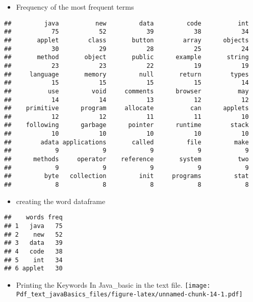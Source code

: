 \documentclass[]{article}
\providecommand{\tightlist}{%
  \setlength{\itemsep}{0pt}\setlength{\parskip}{0pt}}
\begin{document}
\begin{itemize}
\tightlist
\item
  Frequency of the most frequent terms
\end{itemize}

\begin{verbatim}
##         java          new         data         code          int 
##           75           52           39           38           34 
##       applet        class       button        array      objects 
##           30           29           28           25           24 
##       method       object       public      example       string 
##           23           23           22           19           19 
##     language       memory         null       return        types 
##           15           15           15           15           14 
##          use         void     comments      browser          may 
##           14           14           13           12           12 
##    primitive      program     allocate          can      applets 
##           12           12           11           11           10 
##    following      garbage      pointer      runtime        stack 
##           10           10           10           10           10 
##        adata applications       called         file         make 
##            9            9            9            9            9 
##      methods     operator    reference       system          two 
##            9            9            9            9            9 
##         byte   collection         init     programs         stat 
##            8            8            8            8            8
\end{verbatim}

\begin{itemize}
\tightlist
\item
  creating the word dataframe
\end{itemize}

\begin{verbatim}
##    words freq
## 1   java   75
## 2    new   52
## 3   data   39
## 4   code   38
## 5    int   34
## 6 applet   30
\end{verbatim}

\begin{itemize}
\tightlist
\item
  Printing the Keywords In Java\_basic in the text file.
  \texttt{[image: Pdf\_text\_javaBasics\_files/figure-latex/unnamed-chunk-14-1.pdf]}
\end{itemize}
\end{document}
